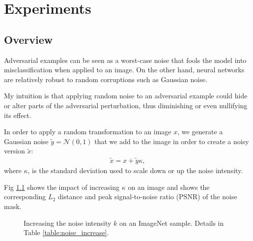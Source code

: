 \chapter{Experiments}
\label{Experiments}

\section{Overview}
\label{sec:experiments_overview}
Adversarial examples can be seen as a worst-case noise that fools the model into
misclassification when applied to an image. On the other hand, neural networks
are relatively robust to random corruptions such as Gaussian noise.

My intuition is that applying random noise to an adversarial example could hide
or alter parts of the adversarial perturbation, thus diminishing or even
nullifying its effect.

In order to apply a random transformation to an image $x$, we generate a
Gaussian noise $\tilde{y}=\mathcal{N}(0,1)$ that we add to the image in order to
create a noisy version $\tilde{x}$:
\begin{align} \label{eq:noisy_version}
    \tilde{x}=x+\tilde{y}\kappa,
\end{align}
where $\kappa$, is the standard deviation used to scale down or up the noise
intensity.

Fig \ref{fig:noise_increase} shows the impact of increasing $\kappa$ on an image
and shows the corresponding $L_2$ distance and peak signal-to-noise ratio (PSNR)
of the noise mask.

\begin{figure}[ht]
      

      

    \caption{ Increasing the noise intensity $k$ on an ImageNet sample. Details
        in Table \ref{table:noise_increase}.}
    \label{fig:noise_increase}
\end{figure}

